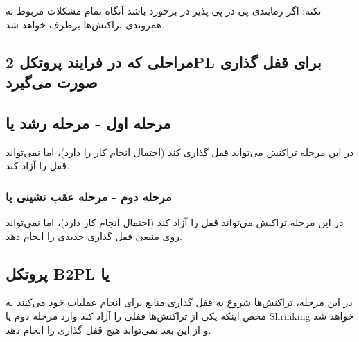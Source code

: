 \documentclass[a4paper]{article}
\begin{document}
نکته: اگر زمابندی پی در پی پذیر در برخورد باشد آنگاه تمام مشکلات مربوط به
همروندی تراکنش‌ها برطرف خواهد شد.

\subsection{مراحلی که در فرایند پروتکل 2PL برای قفل گذاری صورت می‌گیرد}

\subsection*{مرحله اول - مرحله رشد یا }

در این مرحله تراکنش می‌تواند قفل گذاری کند (احتمال انجام کار را دارد)، اما
نمی‌تواند قفل را آزاد کند.

\subsubsection*{مرحله دوم - مرحله عقب نشینی یا }

در این مرحله تراکنش می‌تواند قفل را آزاد کند (احتمال انجام کار دارد)، اما
نمی‌تواند روی منبعی قفل گذاری جدیدی را انجام دهد.

\newpage

\subsection{پروتکل B2PL یا }

در این مرحله، تراکنش‌ها شروع به قفل گذاری منابع برای انجام عملیات خود می‌کنند به
محض اینکه یکی از تراکنش‌ها قفلی را آزاد کند وارد مرحله دوم یا Shrinking خواهد شد
و از این بعد نمی‌تواند هیچ قفل گذاری را انجام دهد.


\begin{LTR}
    \begin{table}[h]
        \begin{RTL}
            \caption{زمانبندی $S_{6}$}
        \end{RTL}
        \centering
    \end{table}
\end{LTR}
\end{document}

